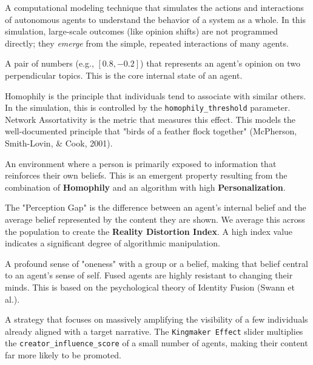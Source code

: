 \documentclass[11pt, a4paper]{article}
\begin{document}
\begin{description}[style=unboxed, leftmargin=0.5cm]
    \item[Agent-Based Model (ABM)] A computational modeling technique that simulates the actions and interactions of autonomous agents to understand the behavior of a system as a whole. In this simulation, large-scale outcomes (like opinion shifts) are not programmed directly; they \textit{emerge} from the simple, repeated interactions of many agents.
    
    \item[Belief Vector] A pair of numbers (e.g., $[0.8, -0.2]$) that represents an agent's opinion on two perpendicular topics. This is the core internal state of an agent.
    
    \item[Homophily \& Network Assortativity] Homophily is the principle that individuals tend to associate with similar others. In the simulation, this is controlled by the \texttt{homophily\_threshold} parameter. Network Assortativity is the metric that measures this effect. This models the well-documented principle that "birds of a feather flock together" (McPherson, Smith-Lovin, \& Cook, 2001).
    
    \item[Echo Chamber / Filter Bubble] An environment where a person is primarily exposed to information that reinforces their own beliefs. This is an emergent property resulting from the combination of \textbf{Homophily} and an algorithm with high \textbf{Personalization}.
    
    \item[Perception Gap \& The Reality Distortion Index] The "Perception Gap" is the difference between an agent's internal belief and the average belief represented by the content they are shown. We average this across the population to create the \textbf{Reality Distortion Index}. A high index value indicates a significant degree of algorithmic manipulation.
    
    \item[Identity Fusion] A profound sense of "oneness" with a group or a belief, making that belief central to an agent's sense of self. Fused agents are highly resistant to changing their minds. This is based on the psychological theory of Identity Fusion (Swann et al.).
    
    \item[Kingmaker Effect] A strategy that focuses on massively amplifying the visibility of a few individuals already aligned with a target narrative. The \texttt{Kingmaker Effect} slider multiplies the \texttt{creator\_influence\_score} of a small number of agents, making their content far more likely to be promoted.
\end{description}
\end{document}
